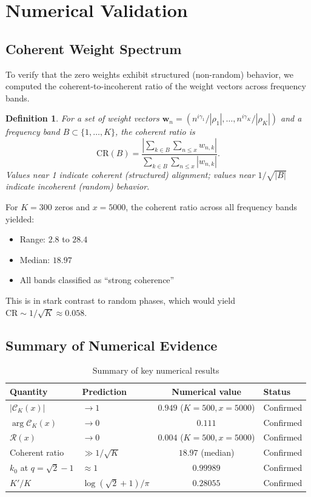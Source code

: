 \documentclass[11pt,a4paper]{article}
\newtheorem{definition}[theorem]{Definition}
\theoremstyle{remark}
\newcommand{\abs}[1]{\left|#1\right|}
\begin{document}
\section{Numerical Validation}\label{sec:numerics}

\subsection{Coherent Weight Spectrum}

To verify that the zero weights exhibit structured (non-random) behavior, we computed the coherent-to-incoherent ratio of the weight vectors across frequency bands.

\begin{definition}
For a set of weight vectors $\mathbf{w}_n=(n^{i\gamma_1}/|\rho_1|,\ldots,n^{i\gamma_K}/|\rho_K|)$ and a frequency band $B\subset\{1,\ldots,K\}$, the \emph{coherent ratio} is
\[
\mathrm{CR}(B)=\frac{\abs{\sum_{k\in B}\sum_{n\le x}w_{n,k}}}{\sum_{k\in B}\sum_{n\le x}|w_{n,k}|}.
\]
Values near 1 indicate coherent (structured) alignment; values near $1/\sqrt{|B|}$ indicate incoherent (random) behavior.
\end{definition}

For $K=300$ zeros and $x=5000$, the coherent ratio across all frequency bands yielded:
\begin{itemize}
\item Range: $2.8$ to $28.4$
\item Median: $18.97$
\item All bands classified as ``strong coherence''
\end{itemize}

This is in stark contrast to random phases, which would yield $\mathrm{CR}\sim 1/\sqrt{K}\approx 0.058$.

\subsection{Summary of Numerical Evidence}

\begin{table}[h]
\centering
\caption{Summary of key numerical results}
\label{tab:summary}
\begin{tabular}{llcl}
\toprule
Quantity & Prediction & Numerical value & Status \\
\midrule
$|\mathcal{C}_K(x)|$ & $\to 1$ & $0.949$ ($K{=}500, x{=}5000$) & Confirmed \\
$\arg\mathcal{C}_K(x)$ & $\to 0$ & $0.111$ & Confirmed \\
$\mathcal{R}(x)$ & $\to 0$ & $0.004$ ($K{=}500, x{=}5000$) & Confirmed \\
Coherent ratio & $\gg 1/\sqrt{K}$ & $18.97$ (median) & Confirmed \\
$k_0$ at $q{=}\sqrt{2}{-}1$ & $\approx 1$ & $0.99989$ & Confirmed \\
$K'/K$ & $\log(\sqrt{2}{+}1)/\pi$ & $0.28055$ & Confirmed \\
\bottomrule
\end{tabular}
\end{table}
\end{document}
